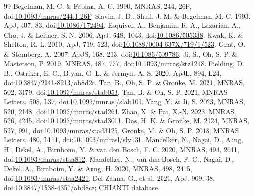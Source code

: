 \documentclass[english,a4paper]{my_memo2}
\begin{document}
\begin{thebibliography}{99}
\footnotesize
{} Begelman, M. C. \& Fabian, A. C. 1990, MNRAS, 244, 26P, doi:\href{https://doi.org/10.1093/mnras/244.1.26P}{10.1093/mnras/244.1.26P}.
 Slavin, J. D., Shull, J. M. \& Begelman, M. C. 1993, ApJ, 407, 83, doi:\href{https://doi.org/10.1086/172494}{10.1086/172494}.
 Esquivel, A., Benjamin, R. A., Lazarian, A., Cho, J. \& Leitner, S. N. 2006, ApJ, 648, 1043, doi:\href{https://doi.org/10.1086/505338}{10.1086/505338}.
 Kwak, K. \& Shelton, R. L. 2010, ApJ, 719, 523, doi:\href{https://doi.org/10.1088/0004-637X/719/1/523}{10.1088/0004-637X/719/1/523}.
 Gnat, O. \& Sternberg, A. 2007, ApJS, 168, 213, doi:\href{https://doi.org/10.1086/509786}{10.1086/509786}.
 Ji, S., Oh, S. P. \& Masterson, P. 2019, MNRAS, 487, 737, doi:\href{https://doi.org/10.1093/mnras/stz1248}{10.1093/mnras/stz1248}.
 Fielding, D. B., Ostriker, E. C., Bryan, G. L. \& Jermyn, A. S. 2020, ApJL, 894, L24, doi:\href{https://doi.org/10.3847/2041-8213/ab8d2c}{10.3847/2041-8213/ab8d2c}.
 Tan, B., Oh, S. P. \& Gronke, M. 2021, MNRAS, 502, 3179, doi:\href{https://doi.org/10.1093/mnras/stab053}{10.1093/mnras/stab053}.
 Tan, B. \& Oh, S. P. 2021, MNRAS Letters, 508, L37, doi:\href{https://doi.org/10.1093/mnrasl/slab100}{10.1093/mnrasl/slab100}.
 Yang, Y. \& Ji, S. 2023, MNRAS, 520, 2148, doi:\href{https://doi.org/10.1093/mnras/stad264}{10.1093/mnras/stad264}.
 Zhao, X. \& Bai, X.-N. 2023, MNRAS, 526, 4245, doi:\href{https://doi.org/10.1093/mnras/stad3011}{10.1093/mnras/stad3011}.
 Das, H. K. \& Gronke, M. 2024, MNRAS, 527, 991, doi:\href{https://doi.org/10.1093/mnras/stad3125}{10.1093/mnras/stad3125}.
 Gronke, M. \& Oh, S. P. 2018, MNRAS Letters, 480, L111, doi:\href{https://doi.org/10.1093/mnrasl/sly131}{10.1093/mnrasl/sly131}.
 Mandelker, N., Nagai, D., Aung, H., Dekel, A., Birnboim, Y. \& van den Bosch, F. C. 2020, MNRAS, 494, 2641, doi:\href{https://doi.org/10.1093/mnras/staa812}{10.1093/mnras/staa812}.
 Mandelker, N., van den Bosch, F. C., Nagai, D., Dekel, A., Birnboim, Y. \& Aung, H. 2020, MNRAS, 498, 2415, doi:\href{https://doi.org/10.1093/mnras/staa2421}{10.1093/mnras/staa2421}.
 Del Zanna, G., et al. 2021, ApJ, 909, 38, doi:\href{https://doi.org/10.3847/1538-4357/abd8ce}{10.3847/1538-4357/abd8ce}; \href{https://www.chiantidatabase.org/}{CHIANTI database}.

\end{thebibliography}
\end{document}
